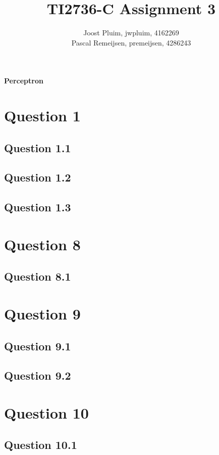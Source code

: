 \documentclass[11pt,twoside,a4paper]{article}
\title{TI2736-C Assignment 3}
\author{
	Joost Pluim, jwpluim, 4162269 \\
	Pascal Remeijsen, premeijsen, 4286243
}
\begin{document}
\maketitle
\clearpage

\textbf{Perceptron}

\section{Question 1}

	\subsection{Question 1.1}
	\subsection{Question 1.2}
	\subsection{Question 1.3}
	
\section{Question 8}

	\subsection{Question 8.1}
	
\section{Question 9}

	\subsection{Question 9.1}
	\subsection{Question 9.2}
	
\section{Question 10}

	\subsection{Question 10.1}
		
\begin{thebibliography}{9}
\end{thebibliography}
\end{document}
